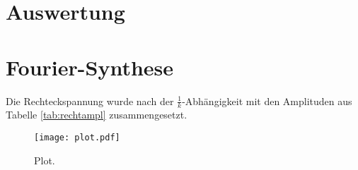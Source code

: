\section{Auswertung}
\label{sec:Auswertung}

\section{Fourier-Synthese}

Die Rechteckspannung wurde nach der $\frac{1}{k}$-Abhängigkeit mit den Amplituden
aus Tabelle \ref{tab:rechtampl} zusammengesetzt.
\begin{figure}
  \centering
  \texttt{[image: plot.pdf]}
  \caption{Plot.}
  \label{fig:plot}
\end{figure}
